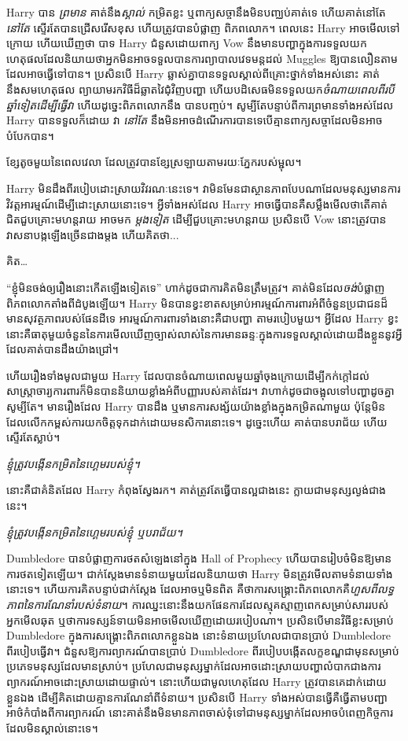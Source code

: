 Harry បាន \emph{ព្រមាន} គាត់នឹង\emph{ស្គាល់} កម្រិតខ្លះ ឬពាក្យសច្ចានឹងមិនបញ្ឈប់គាត់ទេ ហើយគាត់នៅតែ \emph{នៅតែ} ស្ទើរតែបានជ្រើសរើសខុស ហើយត្រូវបានបំផ្លាញ ពិភពលោក។ ពេលនេះ Harry អាចមើលទៅក្រោយ ហើយឃើញថា បាទ Harry ជំនួសដោយពាក្យ Vow នឹងមានបញ្ហាក្នុងការទទួលយកហេតុផលដែលនិយាយថាអ្នកមិនអាចទទួលបានការព្យាបាលវេទមន្តដល់ Muggles ឱ្យបានលឿនតាមដែលអាចធ្វើទៅបាន។ ប្រសិនបើ Harry ឆ្លាស់គ្នាបានទទួលស្គាល់ពីគ្រោះថ្នាក់ទាំងអស់នោះ គាត់នឹងសមហេតុផល ព្យាយាមរកវិធីដ៏ឆ្លាតវៃជុំវិញបញ្ហា ហើយបដិសេធមិនទទួលយក\emph{ចំណាយពេលពីរបីឆ្នាំទៀតដើម្បីធ្វើវា} ហើយដូច្នេះពិភពលោកនឹង បានបញ្ចប់។ សូម្បីតែបន្ទាប់ពីការព្រមានទាំងអស់ដែល Harry បានទទួលក៏ដោយ វា \emph{នៅតែ} នឹងមិនអាចដំណើរការបានទេបើគ្មានពាក្យសច្ចាដែលមិនអាចបំបែកបាន។

ខ្សែតូចមួយនៃពេលវេលា ដែលត្រូវបានខ្សែស្រឡាយតាមរយៈភ្នែករបស់ម្ជុល។

Harry មិនដឹងពីរបៀបដោះស្រាយវិវរណៈនេះទេ។ វា​មិន​មែន​ជា​ស្ថានភាព​បែប​ណា​ដែល​មនុស្ស​មាន​ការ​វិវត្ត​អារម្មណ៍​ដើម្បី​ដោះស្រាយ​នោះ​ទេ។ អ្វីទាំងអស់ដែល Harry អាចធ្វើបានគឺសម្លឹងមើលថាតើគាត់ជិតជួបគ្រោះមហន្តរាយ អាចមក \emph{ម្តងទៀត} ដើម្បីជួបគ្រោះមហន្តរាយ ប្រសិនបើ Vow នោះត្រូវបានវាសនាបង្កឡើងច្រើនជាងម្តង ហើយគិតថា...

គិត…

“ខ្ញុំ​មិន​ចង់​ឲ្យ​រឿង​នោះ​កើត​ឡើង​ទៀត​ទេ” ហាក់​ដូច​ជា​ការ​គិត​មិន​ត្រឹម​ត្រូវ។ គាត់មិនដែល\emph{ចង់}បំផ្លាញពិភពលោកតាំងពីដំបូងឡើយ។ Harry មិនបានខ្វះខាតសម្រាប់អារម្មណ៍ការពារអំពីចំនួនប្រជាជនដ៏មានសុវត្ថភាពរបស់ផែនដីទេ អារម្មណ៍ការពារទាំងនោះគឺជាបញ្ហា\emph{} តាមរបៀបមួយ។ អ្វី​ដែល Harry ខ្វះ​នោះ​គឺ​ធាតុ​មួយ​ចំនួន​នៃ​ការ​មើល​ឃើញ​ច្បាស់​លាស់​នៃ​ការ​មាន​ឆន្ទៈ​ក្នុង​ការ​ទទួល​ស្គាល់​ដោយ​ដឹង​ខ្លួន​នូវ​អ្វី​ដែល​គាត់​បាន​ដឹង​យ៉ាង​ជ្រៅ។

ហើយរឿងទាំងមូលជាមួយ Harry ដែលបានចំណាយពេលមួយឆ្នាំចុងក្រោយដើម្បីកក់ក្ដៅដល់សាស្រ្តាចារ្យការពារក៏មិនបាននិយាយខ្លាំងអំពីបញ្ញារបស់គាត់ដែរ។ វាហាក់ដូចជាចង្អុលទៅបញ្ហាដូចគ្នា សូម្បីតែ។ មានរឿងដែល Harry បានដឹង ឬមានការសង្ស័យយ៉ាងខ្លាំងក្នុងកម្រិតណាមួយ ប៉ុន្តែមិនដែលលើកកម្ពស់ការយកចិត្តទុកដាក់ដោយមនសិការនោះទេ។ ដូច្នេះហើយ គាត់បានបរាជ័យ ហើយស្ទើរតែស្លាប់។

\emph{ខ្ញុំត្រូវបង្កើនកម្រិតនៃហ្គេមរបស់ខ្ញុំ។}

នោះគឺជាគំនិតដែល Harry កំពុងស្វែងរក។ គាត់ត្រូវតែធ្វើបានល្អជាងនេះ ក្លាយជាមនុស្សល្ងង់ជាងនេះ។

\emph{ខ្ញុំត្រូវបង្កើនកម្រិតនៃហ្គេមរបស់ខ្ញុំ ឬបរាជ័យ។}

Dumbledore បាន​បំផ្លាញ​ការ​ថត​សំឡេង​នៅ​ក្នុង Hall of Prophecy ហើយ​បាន​រៀបចំ​មិន​ឱ្យ​មាន​ការ​ថត​ទៀត​ឡើយ។ ជាក់ស្តែងមានទំនាយមួយដែលនិយាយថា Harry មិនត្រូវមើលតាមទំនាយទាំងនោះទេ។ ហើយការគិតបន្ទាប់ជាក់ស្តែង ដែលអាចឬមិនពិត គឺថាការសង្គ្រោះពិភពលោកគឺ\emph{ហួសពីលទ្ធភាពនៃការណែនាំរបស់ទំនាយ}។ ការ​ឈ្នះ​នោះ​នឹង​យក​ផែនការ​ដែល​ស្មុគស្មាញ​ពេក​សម្រាប់​សារ​របស់​អ្នក​មើល​ឆុត ឬ​ថា​ការ​ទស្សន៍ទាយ​មិន​អាច​មើល​ឃើញ​ដោយ​របៀប​ណា។ ប្រសិនបើមានវិធីខ្លះសម្រាប់ Dumbledore ក្នុងការសង្គ្រោះពិភពលោកខ្លួនឯង នោះទំនាយប្រហែលជាបានប្រាប់ Dumbledore ពីរបៀបធ្វើវា។ ជំនួសឱ្យការព្យាករណ៍បានប្រាប់ Dumbledore ពីរបៀបបង្កើតលក្ខខណ្ឌជាមុនសម្រាប់ប្រភេទមនុស្សដែលមានស្រាប់។ ប្រហែលជាមនុស្សម្នាក់ដែលអាចដោះស្រាយបញ្ហាលំបាកជាងការព្យាករណ៍អាចដោះស្រាយដោយផ្ទាល់។ នោះហើយជាមូលហេតុដែល Harry ត្រូវបានគេដាក់ដោយខ្លួនឯង ដើម្បីគិតដោយគ្មានការណែនាំពីទំនាយ។ ប្រសិនបើ Harry ទាំងអស់បានធ្វើគឺធ្វើតាមបញ្ជាអាថ៌កំបាំងពីការព្យាករណ៍ នោះគាត់នឹងមិនមានភាពចាស់ទុំទៅជាមនុស្សម្នាក់ដែលអាចបំពេញកិច្ចការដែលមិនស្គាល់នោះទេ។

